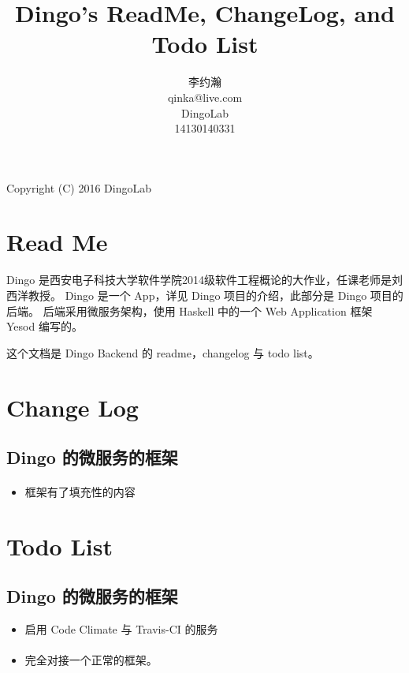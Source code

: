 







\makeatletter
\def\@NoStyleChaper{\ralex} %
\def\@RTCDoc{\ralex} %
\def\@UsingAppendix{\ralex} %
\def\@DocType{article}
\def\@DocTypeCTEX{ctexart}
\makeatother


\title{Dingo's ReadMe, ChangeLog, and Todo List}
\author{李约瀚 \\ qinka@live.com \\ DingoLab \\ 14130140331}


  \maketitle
  \newpage
  {\Huge Copyright (C) 2016 DingoLab}
  \newpage
  \tableofcontents
  \newpage
  \section{Read Me} \label{READMEref}
  Dingo 是西安电子科技大学软件学院2014级软件工程概论的大作业，任课老师是刘西洋教授。
  Dingo 是一个 App，详见 Dingo 项目的介绍，此部分是 Dingo 项目的后端。
  后端采用微服务架构，使用 Haskell 中的一个 Web Application 框架 Yesod 编写的。

  这个文档是 Dingo Backend 的 readme，changelog 与 todo list。
  \section{Change Log} \label{CHANGLOGref}

  \subsection{Dingo 的微服务的框架}
  \paragraph{}
  \begin{itemize}
    \item 框架有了填充性的内容
  \end{itemize}

  \section{Todo List} \label{TODOLISTref}

  \subsection{Dingo 的微服务的框架}
  \begin{itemize}
    \item 启用 Code Climate 与 Travis-CI 的服务
  \end{itemize}
  \paragraph{}
  \begin{itemize}
    \item 完全对接一个正常的框架。
  \end{itemize}


